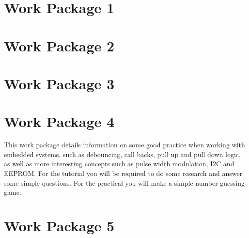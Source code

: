 


\begin{sloppypar}





\tableofcontents
\clearpage

\chapter{Work Package 1}



\chapter{Work Package 2}



 \chapter{Work Package 3}


\chapter{Work Package 4}
This work package details information on some good practice when working with embedded systems, such as debouncing, call backs, pull up and pull down logic, as well as more interesting concepts such as pulse width modulation, I2C and EEPROM. For the tutorial you will be required to do some research and answer some simple questions. For the practical you will make a simple number-guessing game.



 \chapter{Work Package 5}
 
 




\end{sloppypar}

